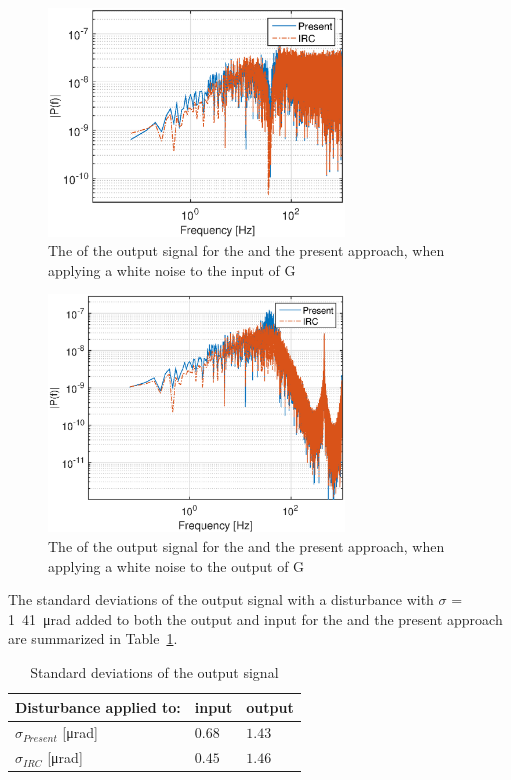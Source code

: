 \begin{figure}[h!]
  \centering
  \includegraphics[width=0.7\textwidth]{fig/matlab/whitenoiseoutput.eps}
  \caption{\label{fig:fft_in} The \abbrFFT of the output signal for the \abbrIRC and the present approach, when applying a white noise to the input of G}
\end{figure}

\begin{figure}[h!]
  \centering
  \includegraphics[width=0.7\textwidth]{fig/matlab/whitenoiseinput.eps}
  \caption{\label{fig:fft_out} The \abbrFFT of the output signal for the \abbrIRC and the present approach, when applying a white noise to the output of G}
\end{figure}


The standard deviations of the output signal with a disturbance with $\sigma$ = \unit{1.41\micro\radian} added to both the output and input for the \abbrIRC and the present approach are summarized in Table~\ref{tab:std}.

\begin{table}[h!]
  \centering
  \begin{tabular}{| l | l | l |}
    \hline
    Disturbance applied to: & input & output \\ \hline
      $\sigma_{Present}$ [\unit{\micro\radian}] & $0.68 $ & $1.43$ \\
      $\sigma_{IRC}$ [\unit{\micro\radian}] & $0.45$  & $ 1.46$ \\
    \hline
  \end{tabular}
  \caption{\label{tab:std} Standard deviations of the output signal}
\end{table}

